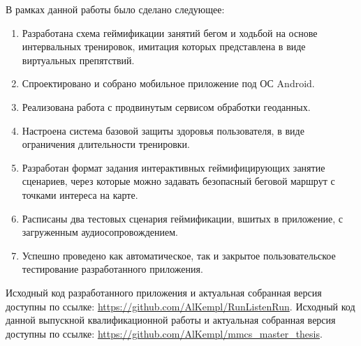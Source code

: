 \Conc
В рамках данной работы было сделано следующее:
\begin{enumerate}
	\item Разработана схема геймификации занятий бегом и ходьбой на основе интервальных тренировок, имитация которых представлена в виде виртуальных препятствий.
	\item Спроектировано и собрано мобильное приложение под ОС Android.
	\item Реализована работа с продвинутым сервисом обработки геоданных.
	\item Настроена система базовой защиты здоровья пользователя, в виде ограничения длительности тренировки.
	\item Разработан формат задания интерактивных геймифицирующих занятие сценариев, через которые можно задавать безопасный беговой маршрут с точками интереса на карте.
	\item Расписаны два тестовых сценария геймификации, вшитых в приложение, с загруженным аудиосопровождением.
	\item Успешно проведено как автоматическое, так и закрытое пользовательское тестирование разработанного приложения.
\end{enumerate} 
\medskip
Исходный код разработанного приложения и актуальная собранная версия доступны по ссылке: \url{https://github.com/AlKempl/RunListenRun}.
\medskip
Исходный код данной выпускной квалификационной работы и актуальная собранная версия доступны по ссылке: \url{https://github.com/AlKempl/mmcs_master_thesis}.


